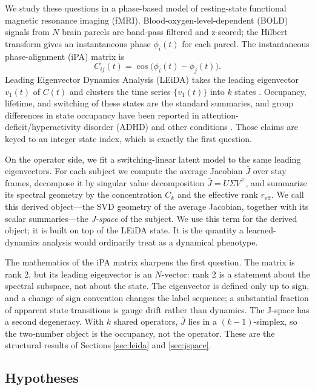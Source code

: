 \documentclass[11pt]{article}
\theoremstyle{definition}
\begin{document}
We study these questions in a phase-based model of resting-state functional magnetic
resonance imaging (fMRI). Blood-oxygen-level-dependent (BOLD) signals from $N$ brain
parcels are band-pass filtered and z-scored; the Hilbert transform gives an instantaneous
phase $\phi_i(t)$ for each parcel. The instantaneous phase-alignment (iPA) matrix is
\begin{equation}
C_{ij}(t)=\cos\big(\phi_i(t)-\phi_j(t)\big).
\end{equation}
Leading Eigenvector Dynamics Analysis (LEiDA) takes the leading eigenvector $v_1(t)$ of
$C(t)$ and clusters the time series $\{v_1(t)\}$ into $k$ states
\cite{Cabral2017,Glerean2012}. Occupancy, lifetime, and switching of these
states are the standard summaries, and group differences in state occupancy have been
reported in attention-deficit/hyperactivity disorder (ADHD) and other conditions
\cite{deLacy2019,Shappell2021,Ahmadi2021,Kaboodvand2020}. Those claims are keyed to an
integer state index, which is exactly the first question.

On the operator side, we fit a switching-linear latent model
\cite{Linderman2017,Taghia2018} to the same leading eigenvectors. For each
subject we compute the average Jacobian $\bar J$ over stay frames, decompose it by
singular value decomposition $\bar J=U\Sigma V^{\top}$, and summarize its spectral
geometry by the concentration $C_k$ and the effective rank $r_{\mathrm{eff}}$. We call this derived
object---the SVD geometry of the average Jacobian, together with its scalar
summaries---the \emph{J-space} of the subject. We use this term for the derived object;
it is built on top of the LEiDA state. It is the quantity a learned-dynamics analysis
would ordinarily treat as a dynamical phenotype.

The mathematics of the iPA matrix sharpens the first question. The matrix is rank 2, but
its leading eigenvector is an $N$-vector: rank 2 is a statement about the spectral
subspace, not about the state. The eigenvector is defined only up to sign, and a change
of sign convention changes the label sequence; a substantial fraction of apparent state
transitions is gauge drift rather than dynamics. The J-space has a second degeneracy.
With $k$ shared operators, $\bar J$ lies in a $(k-1)$-simplex, so the two-number object
is the occupancy, not the operator. These are the structural results of Sections
\ref{sec:leida} and \ref{sec:jspace}.

\subsection*{Hypotheses}
\end{document}
